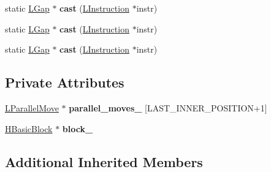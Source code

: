 \begin{DoxyCompactItemize}
\item 
static \hyperlink{classv8_1_1internal_1_1_l_gap}{L\+Gap} $\ast$ {\bfseries cast} (\hyperlink{classv8_1_1internal_1_1_l_instruction}{L\+Instruction} $\ast$instr)\hypertarget{classv8_1_1internal_1_1_l_gap_a326a34a94ba4018b329953451b663cc8}{}\label{classv8_1_1internal_1_1_l_gap_a326a34a94ba4018b329953451b663cc8}

\item 
static \hyperlink{classv8_1_1internal_1_1_l_gap}{L\+Gap} $\ast$ {\bfseries cast} (\hyperlink{classv8_1_1internal_1_1_l_instruction}{L\+Instruction} $\ast$instr)\hypertarget{classv8_1_1internal_1_1_l_gap_a326a34a94ba4018b329953451b663cc8}{}\label{classv8_1_1internal_1_1_l_gap_a326a34a94ba4018b329953451b663cc8}

\item 
static \hyperlink{classv8_1_1internal_1_1_l_gap}{L\+Gap} $\ast$ {\bfseries cast} (\hyperlink{classv8_1_1internal_1_1_l_instruction}{L\+Instruction} $\ast$instr)\hypertarget{classv8_1_1internal_1_1_l_gap_a326a34a94ba4018b329953451b663cc8}{}\label{classv8_1_1internal_1_1_l_gap_a326a34a94ba4018b329953451b663cc8}

\end{DoxyCompactItemize}
\subsection*{Private Attributes}
\begin{DoxyCompactItemize}
\item 
\hyperlink{classv8_1_1internal_1_1_l_parallel_move}{L\+Parallel\+Move} $\ast$ {\bfseries parallel\+\_\+moves\+\_\+} \mbox{[}L\+A\+S\+T\+\_\+\+I\+N\+N\+E\+R\+\_\+\+P\+O\+S\+I\+T\+I\+ON+1\mbox{]}\hypertarget{classv8_1_1internal_1_1_l_gap_acca2750565e7b2c4d4b454e2f3113f80}{}\label{classv8_1_1internal_1_1_l_gap_acca2750565e7b2c4d4b454e2f3113f80}

\item 
\hyperlink{classv8_1_1internal_1_1_h_basic_block}{H\+Basic\+Block} $\ast$ {\bfseries block\+\_\+}\hypertarget{classv8_1_1internal_1_1_l_gap_adec5c85f790870f0870cf5f002ac66e2}{}\label{classv8_1_1internal_1_1_l_gap_adec5c85f790870f0870cf5f002ac66e2}

\end{DoxyCompactItemize}
\subsection*{Additional Inherited Members}



